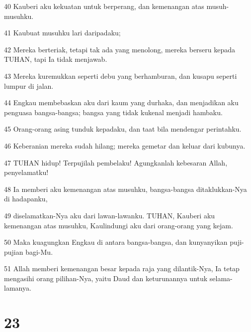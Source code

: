 \par 40 Kauberi aku kekuatan untuk berperang, dan kemenangan atas musuh-musuhku.
\par 41 Kaubuat musuhku lari daripadaku;
\par 42 Mereka berteriak, tetapi tak ada yang menolong, mereka berseru kepada TUHAN, tapi Ia tidak menjawab.
\par 43 Mereka kuremukkan seperti debu yang berhamburan, dan kusapu seperti lumpur di jalan.
\par 44 Engkau membebaskan aku dari kaum yang durhaka, dan menjadikan aku penguasa bangsa-bangsa; bangsa yang tidak kukenal menjadi hambaku.
\par 45 Orang-orang asing tunduk kepadaku, dan taat bila mendengar perintahku.
\par 46 Keberanian mereka sudah hilang; mereka gemetar dan keluar dari kubunya.
\par 47 TUHAN hidup! Terpujilah pembelaku! Agungkanlah kebesaran Allah, penyelamatku!
\par 48 Ia memberi aku kemenangan atas musuhku, bangsa-bangsa ditaklukkan-Nya di hadapanku,
\par 49 diselamatkan-Nya aku dari lawan-lawanku. TUHAN, Kauberi aku kemenangan atas musuhku, Kaulindungi aku dari orang-orang yang kejam.
\par 50 Maka kuagungkan Engkau di antara bangsa-bangsa, dan kunyanyikan puji-pujian bagi-Mu.
\par 51 Allah memberi kemenangan besar kepada raja yang dilantik-Nya, Ia tetap mengasihi orang pilihan-Nya, yaitu Daud dan keturunannya untuk selama-lamanya.

\chapter{23}


